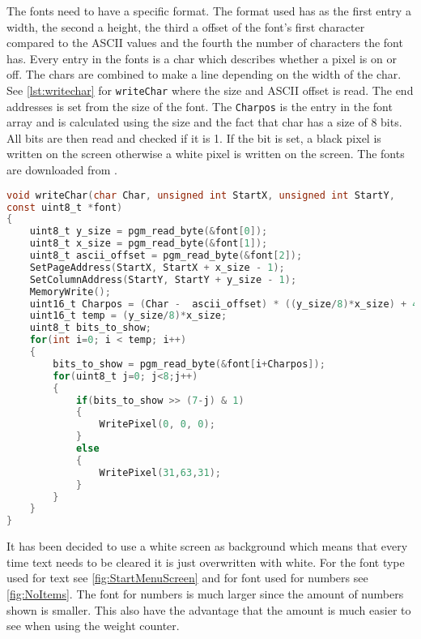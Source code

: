 The fonts need to have a specific format. 
The format used has as the first entry a width, the second a height, the third a offset of the font's first character compared to the ASCII values and the fourth the number of characters the font has. 
Every entry in the fonts is a char which describes whether a pixel is on or off. 
The chars are combined to make a line depending on the width of the char. 
See \cref{lst:writechar} for \texttt{writeChar} where the size and ASCII offset is read. 
The end addresses is set from the size of the font. 
The \texttt{Charpos} is the entry in the font array and is calculated using the size and the fact that char has a size of 8 bits. 
All bits are then read and checked if it is 1. 
If the bit is set, a black pixel is written on the screen otherwise a white pixel is written on the screen. The fonts are downloaded from \cite{UTFT}.
\vspace{-20pt}
\begin{lstlisting}[caption={\texttt{writeChar} function.}, label={lst:writechar}, language=C, directivestyle={\color{black}},
emph={int,char,double,float,unsigned}, emphstyle={\color{blue}}]
void writeChar(char Char, unsigned int StartX, unsigned int StartY,
const uint8_t *font)
{
	uint8_t y_size = pgm_read_byte(&font[0]);
	uint8_t x_size = pgm_read_byte(&font[1]);
	uint8_t ascii_offset = pgm_read_byte(&font[2]);
	SetPageAddress(StartX, StartX + x_size - 1);
	SetColumnAddress(StartY, StartY + y_size - 1);	
	MemoryWrite();
	uint16_t Charpos = (Char -  ascii_offset) * ((y_size/8)*x_size) + 4;
	uint16_t temp = (y_size/8)*x_size;
	uint8_t bits_to_show;
	for(int i=0; i < temp; i++)
	{
		bits_to_show = pgm_read_byte(&font[i+Charpos]);
		for(uint8_t j=0; j<8;j++)
		{
			if(bits_to_show >> (7-j) & 1)
			{
				WritePixel(0, 0, 0);
			}
			else
			{
				WritePixel(31,63,31);
			}
		}
	}
}
\end{lstlisting}
It has been decided to use a white screen as background which means that every time text needs to be cleared it is just overwritten with white. For the font type used for text see \cref{fig:StartMenuScreen} and for font used for numbers see \cref{fig:NoItems}.
The font for numbers is much larger since the amount of numbers shown is smaller. This also have the advantage that the amount is much easier to see when using the weight counter.



